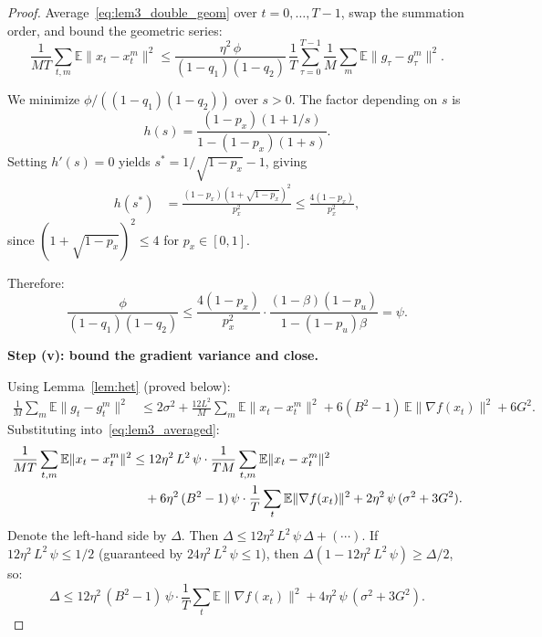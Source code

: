\documentclass{article}
\begin{document}
\begin{proof}
Average~\eqref{eq:lem3_double_geom} over $t = 0, \ldots, T-1$, swap the
summation order, and bound the geometric series:
\begin{equation}
\frac{1}{MT}\sum_{t,m}\mathbb{E}\|x_t - x_t^m\|^2
\leq \frac{\eta^2\,\phi}{(1-q_1)(1-q_2)}\,
\frac{1}{T}\sum_{\tau=0}^{T-1}
\frac{1}{M}\sum_m\mathbb{E}\|g_\tau - g_\tau^m\|^2.
\label{eq:lem3_averaged}
\end{equation}

We minimize $\phi/((1-q_1)(1-q_2))$ over $s > 0$. The factor depending on $s$
is
\begin{equation}
h(s) = \frac{(1-p_x)(1+1/s)}{1 - (1-p_x)(1+s)}.
\label{eq:lem3_hs}
\end{equation}
Setting $h'(s) = 0$ yields $s^* = 1/\sqrt{1-p_x} - 1$, giving
\begin{align}
h(s^*)
&= \frac{(1-p_x)(1 + \sqrt{1-p_x})^2}{p_x^2}
\leq \frac{4(1-p_x)}{p_x^2},
\label{eq:lem3_hs_optimal}
\end{align}
since $(1 + \sqrt{1-p_x})^2 \leq 4$ for $p_x \in [0,1]$.

Therefore:
\begin{equation}
\frac{\phi}{(1-q_1)(1-q_2)}
\leq \frac{4(1-p_x)}{p_x^2}\cdot
\frac{(1-\beta)(1-p_u)}{1-(1-p_u)\beta}
= \psi.
\label{eq:lem3_psi_bound}
\end{equation}

\medskip
\noindent\textbf{Step (v): bound the gradient variance and close.}

Using Lemma~\ref{lem:het} (proved below):
\begin{align}
\frac{1}{M}\sum_m\mathbb{E}\|g_t - g_t^m\|^2
&\leq 2\sigma^2 + \frac{12L^2}{M}\sum_m\mathbb{E}\|x_t - x_t^m\|^2
+ 6(B^2-1)\,\mathbb{E}\|\nabla f(x_t)\|^2 + 6G^2.
\label{eq:lem3_grad_var}
\end{align}
Substituting into~\eqref{eq:lem3_averaged}:
\begin{align}
\frac{1}{MT}\sum_{t,m}\mathbb{E}\|x_t - x_t^m\|^2
&\leq 12\eta^2\,L^2\,\psi\cdot
\frac{1}{TM}\sum_{t,m}\mathbb{E}\|x_t - x_t^m\|^2 \notag \\
&\quad+ 6\eta^2\,(B^2-1)\,\psi\cdot
\frac{1}{T}\sum_t\mathbb{E}\|\nabla f(x_t)\|^2
+ 2\eta^2\,\psi\,(\sigma^2 + 3G^2).
\label{eq:lem3_self_ref}
\end{align}
Denote the left-hand side by $\Delta$. Then
$\Delta \leq 12\eta^2\,L^2\,\psi\,\Delta + (\cdots)$.
If $12\eta^2\,L^2\,\psi \leq 1/2$ (guaranteed by
$24\eta^2\,L^2\,\psi \leq 1$), then
$\Delta(1 - 12\eta^2\,L^2\,\psi) \geq \Delta/2$, so:
\begin{equation}
\Delta \leq 12\eta^2\,(B^2-1)\,\psi\cdot
\frac{1}{T}\sum_t\mathbb{E}\|\nabla f(x_t)\|^2
+ 4\eta^2\,\psi\,(\sigma^2 + 3G^2).
\label{eq:lem3_closed}
\end{equation}
\end{proof}
\end{document}
